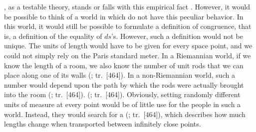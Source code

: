 \documentclass[final]{article}
\renewcommand{\rzlap}[2]{(\cite[#1]{Reichenbach1928}; tr.\ [#2])\xspace}
\begin{document}
\Gr, as a testable theory, stands or falls with this empirical fact . However, it would be possible to think of a world in which \rac do not have this peculiar  behavior. In this world, it would still be possible to formulate a definition of congruence, that is, a definition of the equality of $ds$'s. However, such a definition would not be unique. The units of length would have to be given for every space point, and we could not simply rely on the Paris standard meter. In a Riemannian world, if we know the length of a room, we also know the number of unit rods that we can place along one of its walls \rzlap{333}{464}. In a non-Riemannian world, such a number would depend upon the path by which the rods were actually brought into the room \rzlap{333}{464}.  \rzlap{333}{464}. Obviously, setting randomly different units of measure at every point would be of little use for the people in such a world. Instead, they would search for a  \rzlap{333}{464}, which describes how much lengths change when transported between infinitely close points.

\end{document}
